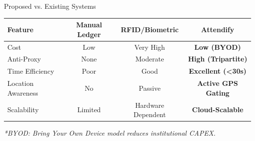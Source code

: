 \documentclass[11pt, aspectratio=169]{beamer}
\begin{document}
\begin{frame}{Proposed vs. Existing Systems}
    \begin{table}
        \centering
        \small
        \begin{tabular}{@{}lccc@{}}
            \toprule
            \textbf{Feature} & \textbf{Manual Ledger} & \textbf{RFID/Biometric} & \textbf{Attendify} \\ \midrule
            Cost & Low & Very High & \textbf{Low (BYOD)} \\
            Anti-Proxy & None & Moderate & \textbf{High (Tripartite)} \\
            Time Efficiency & Poor & Good & \textbf{Excellent (<30s)} \\
            Location Awareness & No & Passive & \textbf{Active GPS Gating} \\
            Scalability & Limited & Hardware Dependent & \textbf{Cloud-Scalable} \\ \bottomrule
        \end{tabular}
    \end{table}
    \vfill
    \textit{*BYOD: Bring Your Own Device model reduces institutional CAPEX.}
\end{frame}

\end{document}
